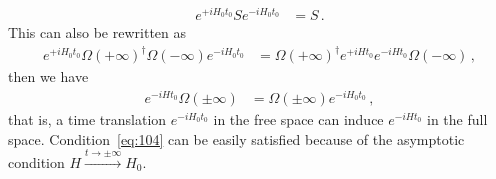 \documentclass[12pt,a4paper]{article}
\begin{document}
\begin{equation}
\label{eq:102}
\begin{split}
e^{+iH_{0} t_0}Se^{-iH_{0}t_0} &= S \,.
\end{split}
\end{equation}
This can also be rewritten as
\begin{equation}
\label{eq:103}
\begin{split}
e^{+iH_{0} t_0}\Omega(+\infty)^{\dag}\Omega(-\infty)e^{-iH_{0}t_0}
&= \Omega(+\infty)^{\dag}e^{+iH t_0}e^{-iH t_0}\Omega(-\infty) \,,
\end{split}
\end{equation}
then we have~\cite{m}
\begin{equation}
\label{eq:104}
\begin{split}
e^{-iH t_0}\Omega(\pm\infty) &= \Omega(\pm\infty)e^{-iH_{0} t_0} \,,
\end{split}
\end{equation}
that is, a time translation $e^{-iH_{0}t_0}$ in the free space can induce $e^{-iH t_0}$ in the full space.
Condition~\eqref{eq:104} can be easily satisfied because of the
asymptotic condition $H\stackrel{t\rightarrow\pm
\infty}{\longrightarrow}H_0$.
\end{document}
